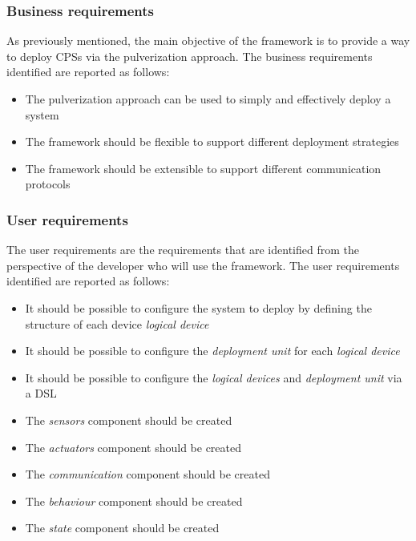 \subsubsection{Business requirements}
\label{sec:business-requirements}

As previously mentioned, the main objective of the framework is to provide a way to deploy CPSs via the pulverization approach.
The business requirements identified are reported as follows:

\begin{itemize}
	\item The pulverization approach can be used to simply and effectively deploy a system
	\item The framework should be flexible to support different deployment strategies
	\item The framework should be extensible to support different communication protocols
\end{itemize}

\subsubsection{User requirements}
\label{sec:user-requirements}

The user requirements are the requirements that are identified from the perspective of the developer who will use the framework.
The user requirements identified are reported as follows:

\begin{itemize}
	\item It should be possible to configure the system to deploy by defining the structure of each device \emph{logical device}
	\item It should be possible to configure the \emph{deployment unit} for each \emph{logical device}
	\item It should be possible to configure the \emph{logical devices} and \emph{deployment unit} via a DSL
	\item The \emph{sensors} component should be created
	\item The \emph{actuators} component should be created
	\item The \emph{communication} component should be created
	\item The \emph{behaviour} component should be created
	\item The \emph{state} component should be created
\end{itemize}

